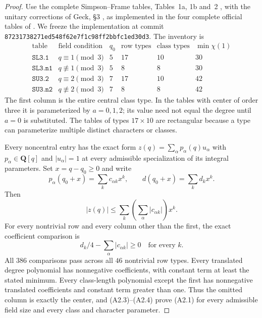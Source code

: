 \begin{proof}
Use the complete Simpson--Frame tables, Tables~1a, 1b and~2
\cite{A2:SF73}, with the unitary corrections of Geck,
\S3 \cite{A2:Geck90}, as implemented in the four complete official
tables of \cite{G2T:GCT}.  We freeze the implementation at commit
\texttt{87231738271ed548f62e7f1c98ff2bbfc1ed30d3}.
The inventory is
\[
\begin{array}{l|l|r|r|r|r}
\text{table}&\text{field condition}&q_0&\text{row types}&
 \text{class types}&\min\chi(1)\\\hline
\texttt{SL3.1}&q\equiv1\pmod3&5&17&10&30\\
\texttt{SL3.n1}&q\not\equiv1\pmod3&5&8&8&30\\
\texttt{SU3.2}&q\equiv2\pmod3&7&17&10&42\\
\texttt{SU3.n2}&q\not\equiv2\pmod3&7&8&8&42
\end{array}                                                     \tag{A2.2}
\]
The first column is the entire central class type.  In the tables
with center of order three it is parameterized by $a=0,1,2$;
its value need not equal the degree until $a=0$ is substituted.
The tables of types $17\times10$ are rectangular because a type
can parameterize multiple distinct characters or classes.

Every noncentral entry has the exact form
$z(q)=\sum_\alpha p_\alpha(q)u_\alpha$ with
$p_\alpha\in\mathbf Q[q]$ and $|u_\alpha|=1$ at every admissible
specialization of its integral parameters.  Set $x=q-q_0\ge0$ and
write
\[
 p_\alpha(q_0+x)=\sum_k c_{\alpha k}x^k,
 \qquad d(q_0+x)=\sum_k d_kx^k.
\]
Then
\[
 |z(q)|\le\sum_k\left(\sum_\alpha|c_{\alpha k}|\right)x^k.
                                                                  \tag{A2.3}
\]
For every nontrivial row and every column other than the first,
the exact coefficient comparison is
\[
       d_k/4-\sum_\alpha|c_{\alpha k}|\ge0
                         \quad\text{for every }k.          \tag{A2.4}
\]
All $386$ comparisons pass across all $46$ nontrivial row types.
Every translated degree polynomial has nonnegative coefficients,
with constant term at least the stated minimum.  Every class-length
polynomial except the first has nonnegative translated coefficients
and constant term greater than one.  Thus the omitted column is
exactly the center, and (A2.3)--(A2.4) prove (A2.1) for every
admissible field size and every class and character parameter.


\end{proof}
